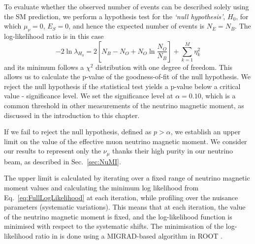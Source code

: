 To evaluate whether the observed number of events can be described solely using the \gls{SM} prediction, we perform a hypothesis test for the \textit{`null hypothesis'}, $H_0$, for which $\mu_\nu=0$, $E_S=0$, and hence the expected number of events is $N_E=N_B$. The log-likelihood ratio is in this case
\begin{equation}\label{eq:NullHypothesisLogLikelihood}
-2\ln\lambda_{H_0}=
2\left[N_B-N_O+N_O\ln\frac{N_O}{N_B}\right] + \sum_{k=1}^M \eta_k^2
\end{equation}
and its minimum follows a $\chi^2$ distribution with one degree of freedom. This allows us to calculate the p-value of the goodness-of-fit of the null hypothesis. We reject the null hypothesis if the statistical test yields a p-value below a critical value - significance level. We set the significance level at $\alpha=0.10$, which is a common threshold in other measurements of the neutrino magnetic moment, as discussed in the introduction to this chapter.


If we fail to reject the null hypothesis, defined as $p>\alpha$, we establish an upper limit on the value of the effective muon neutrino magnetic moment. We consider our results to represent only the $\nu_\mu$ thanks their high purity in our neutrino beam, as described in Sec.~\ref{sec:NuMI}.

The upper limit is calculated by iterating over a fixed range of neutrino magnetic moment values and calculating the minimum log likelihood from Eq.~\ref{eq:FullLogLikelihood} at each iteration, while profiling over the nuisance parameters (systematic variations). This means that at each iteration, the value of the neutrino magnetic moment is fixed, and the log-likelihood function is minimised with respect to the systematic shifts. The minimisation of the log-likelihood ratio in  is done using a MIGRAD-based algorithm in ROOT \cite{ROOT}.

